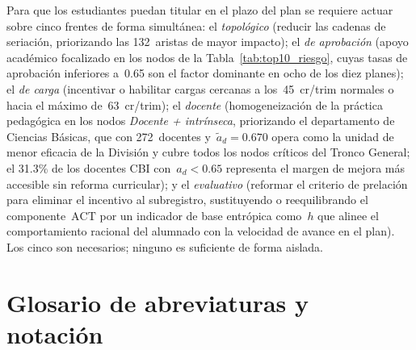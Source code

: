 \documentclass[11pt,letterpaper]{article}
\begin{document}
Para que los estudiantes puedan titular en el plazo del plan se requiere actuar
sobre cinco frentes de forma simultánea:
el \emph{topológico} (reducir las cadenas de seriación, priorizando las
132~aristas de mayor impacto);
el \emph{de aprobación} (apoyo académico focalizado en los nodos de la
Tabla~\ref{tab:top10_riesgo}, cuyas tasas de aprobación inferiores a~0.65
son el factor dominante en ocho de los diez planes);
el \emph{de carga} (incentivar o habilitar cargas cercanas a los~45~cr/trim
normales o hacia el máximo de~63~cr/trim);
el \emph{docente} (homogeneización de la práctica pedagógica en los nodos
\emph{Docente + intrínseca}, priorizando el departamento de Ciencias Básicas,
que con 272~docentes y~$\tilde{a}_d=0.670$ opera como la unidad de menor
eficacia de la División y cubre todos los nodos críticos del Tronco General;
el 31.3\% de los docentes CBI con~$a_d<0.65$ representa el margen de mejora
más accesible sin reforma curricular); y el \emph{evaluativo}
(reformar el criterio de prelación para eliminar el incentivo al subregistro,
sustituyendo o reequilibrando el componente~$\mathrm{ACT}$ por un indicador de
base entrópica como~$h$ que alinee el comportamiento racional del alumnado con la
velocidad de avance en el plan).
Los cinco son necesarios; ninguno es suficiente de forma aislada.




\clearpage

{\small



}

\clearpage
\section*{Glosario de abreviaturas y notación}
\end{document}
